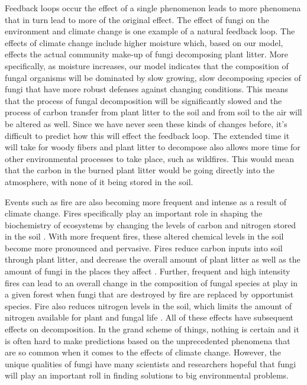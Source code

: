 \documentclass[12pt]{article}
\begin{document}
Feedback loops occur the effect of a single phenomenon leads to more phenomena that in turn lead to more of the original effect. The effect of fungi on the environment and climate change is one example of a natural feedback loop. 
The effects of climate change include higher moisture which, based on our model, effects the actual community make-up of fungi decomposing plant litter. More specifically, as moisture increases, our model indicates that the composition of fungal organisms will be dominated by slow growing, slow decomposing species of fungi that have more robust defenses against changing conditions. This means that the process of fungal decomposition will be significantly slowed and the process of carbon transfer from plant litter to the soil and from soil to the air will be altered as well. Since we have never seen these kinds of changes before, it’s difficult to predict how this will effect the feedback loop. The extended time it will take for woody fibers and plant litter to decompose also allows more time for other environmental processes to take place, such as wildfires. This would mean that the carbon in the burned plant litter would be going directly into the atmosphere, with none of it being stored in the soil. 

Events such as fire are also becoming more frequent and intense as a result of climate change. Fires specifically play an important role in shaping the biochemistry of ecosystems by changing the levels of carbon and nitrogen stored in the soil \cite{pellegrini}. With more frequent fires, these altered chemical levels in the soil become more pronounced and pervasive. Fires reduce carbon inputs into soil through plant litter, and decrease the overall amount of plant litter as well as the amount of fungi in the places they affect \cite{pellegrini}. Further, frequent and high intensity fires can lead to an overall change in the composition of fungal species at play in a given forest when fungi that are destroyed by fire are replaced by opportunist species. Fire also reduces nitrogen levels in the soil, which limits the amount of nitrogen available for plant and fungal life \cite{pellegrini}. All of these effects have subsequent effects on decomposition. In the grand scheme of things, nothing is certain and it is often hard to make predictions based on the unprecedented phenomena that are so common when it comes to the effects of climate change. However, the unique qualities of fungi have many scientists and researchers hopeful that fungi will play an important roll in finding solutions to big environmental problems. 
\end{document}
